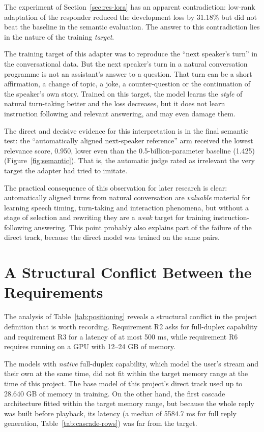 The experiment of Section~\ref{sec:res-lora} has an apparent contradiction: low-rank adaptation
of the responder reduced the development loss by 31.18\% but did not beat the baseline in the
semantic evaluation. The answer to this contradiction lies in the nature of the training
\emph{target}.

The training target of this adapter was to reproduce the ``next speaker's turn'' in the
conversational data. But the next speaker's turn in a natural conversation programme is not an
assistant's answer to a question. That turn can be a short affirmation, a change of topic, a
joke, a counter-question or the continuation of the speaker's own story. Trained on this target,
the model learns the \emph{style} of natural turn-taking better and the loss decreases, but it does
not learn instruction following and relevant answering, and may even damage them.

The direct and decisive evidence for this interpretation is in the final semantic test: the
``automatically aligned next-speaker reference'' arm received the lowest relevance score, 0.950,
lower even than the 0.5-billion-parameter baseline (1.425) (Figure~\ref{fig:semantic}). That is,
the automatic judge rated as irrelevant the very target the adapter had tried to imitate.

The practical consequence of this observation for later research is clear: automatically aligned
turns from natural conversation are \emph{valuable} material for learning speech timing,
turn-taking and interaction phenomena, but without a stage of selection and rewriting they are a
\emph{weak} target for training instruction-following answering. This point probably also
explains part of the failure of the direct track, because the direct model was trained on the
same pairs.

\section{A Structural Conflict Between the Requirements}
\label{sec:disc-conflict}

The analysis of Table~\ref{tab:positioning} reveals a structural conflict in the project
definition that is worth recording. Requirement R2 asks for full-duplex capability and
requirement R3 for a latency of at most 500 ms, while requirement R6 requires running on a GPU
with 12--24 GB of memory.

The models with \emph{native} full-duplex capability, which model the user's stream and
their own at the same time, did not fit within the target memory range at the time of this
project. The base model of this project's direct track used up to 28.640 GB of memory in
training. On the other hand, the first cascade architecture fitted within the target memory
range, but because the whole reply was built before playback, its latency (a median of 5584.7 ms
for full reply generation, Table~\ref{tab:cascade-rows}) was far from the target.

